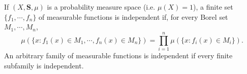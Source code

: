If $(X, \mathbf{S}, \mu)$ is a probability measure space (i.e. $\mu(X) = 1$), a finite set $\{f_1, \cdots, f_n\}$ of measurable functions is independent if, for every Borel set $M_1, \cdots, M_n$,
$$\mu(\{x: f_1(x) \in M_1, \cdots, f_n(x) \in M_n\}) = \prod_{i=1}^{n} \mu(\{x: f_i(x) \in M_i\}).$$
An arbitrary family of measurable functions is independent if every finite subfamily is independent.

